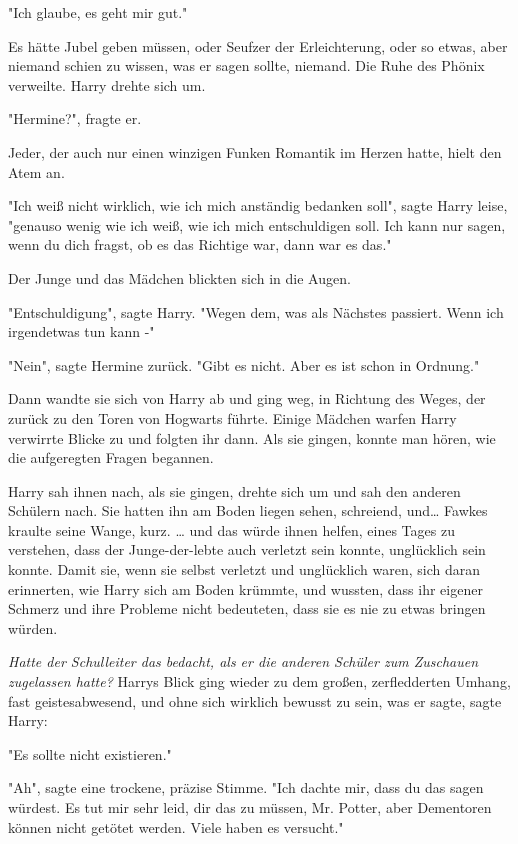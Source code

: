 {"Ich glaube, es geht mir gut."

Es hätte Jubel geben müssen, oder Seufzer der Erleichterung, oder so etwas, aber niemand schien zu wissen, was er sagen sollte, niemand. Die Ruhe des Phönix verweilte. Harry drehte sich um.

"Hermine?", fragte er.

Jeder, der auch nur einen winzigen Funken Romantik im Herzen hatte, hielt den Atem an.

"Ich weiß nicht wirklich, wie ich mich anständig bedanken soll", sagte Harry leise, "genauso wenig wie ich weiß, wie ich mich entschuldigen soll. Ich kann nur sagen, wenn du dich fragst, ob es das Richtige war, dann war es das."

Der Junge und das Mädchen blickten sich in die Augen.

"Entschuldigung", sagte Harry. "Wegen dem, was als Nächstes passiert. Wenn ich irgendetwas tun kann -"

"Nein", sagte Hermine zurück. "Gibt es nicht. Aber es ist schon in Ordnung."

Dann wandte sie sich von Harry ab und ging weg, in Richtung des Weges, der zurück zu den Toren von Hogwarts führte. Einige Mädchen warfen Harry verwirrte Blicke zu und folgten ihr dann. Als sie gingen, konnte man hören, wie die aufgeregten Fragen begannen.

Harry sah ihnen nach, als sie gingen, drehte sich um und sah den anderen Schülern nach. Sie hatten ihn am Boden liegen sehen, schreiend, und… Fawkes kraulte seine Wange, kurz. … und das würde ihnen helfen, eines Tages zu verstehen, dass der Junge-der-lebte auch verletzt sein konnte, unglücklich sein konnte. Damit sie, wenn sie selbst verletzt und unglücklich waren, sich daran erinnerten, wie Harry sich am Boden krümmte, und wussten, dass ihr eigener Schmerz und ihre Probleme nicht bedeuteten, dass sie es nie zu etwas bringen würden.

\emph{\hfill\break Hatte der Schulleiter das bedacht, als er die anderen Schüler zum Zuschauen zugelassen hatte?} Harrys Blick ging wieder zu dem großen, zerfledderten Umhang, fast geistesabwesend, und ohne sich wirklich bewusst zu sein, was er sagte, sagte Harry:

"Es sollte nicht existieren."

"Ah", sagte eine trockene, präzise Stimme. "Ich dachte mir, dass du das sagen würdest. Es tut mir sehr leid, dir das zu müssen, Mr. Potter, aber Dementoren können nicht getötet werden. Viele haben es versucht."

}
